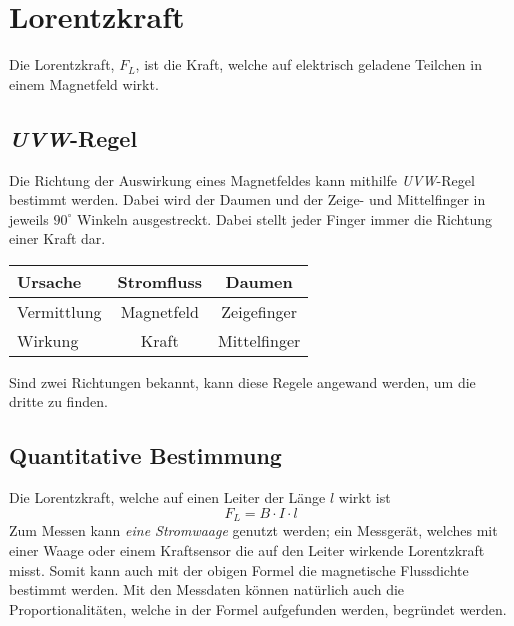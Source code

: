 \documentclass{article}
\begin{document}
 
\section{Lorentzkraft}
Die Lorentzkraft, $F_L$, ist die Kraft, welche auf elektrisch geladene Teilchen in einem Magnetfeld wirkt. 
\subsection{\emph{UVW}-Regel} 
Die Richtung der Auswirkung eines Magnetfeldes kann mithilfe \emph{UVW}-Regel bestimmt werden. Dabei wird der Daumen und der Zeige- und Mittelfinger in jeweils $90^\circ$ Winkeln ausgestreckt. Dabei stellt jeder Finger immer die Richtung einer Kraft dar.
\begin{center}
\begin{tabular}{ |l|c|c| }
\hline
 \colorbox{red!30}{U}rsache & Stromfluss & Daumen \\
\hline
 \colorbox{red!30}{V}ermittlung & Magnetfeld & Zeigefinger \\
\hline
 \colorbox{red!30}{W}irkung & Kraft & Mittelfinger \\
\hline
\end{tabular}
\end{center}
Sind zwei Richtungen bekannt, kann diese Regele angewand werden, um die dritte zu finden.
 
\subsection{Quantitative Bestimmung} 
\begin{minipage}{\dimexpr\linewidth-5cm} 
Die Lorentzkraft, welche auf einen Leiter der Länge $l$ wirkt ist
\[
 F_L = B \cdot I \cdot l
\]
Zum Messen kann \emph{eine Stromwaage} genutzt werden; ein Messgerät, welches mit einer Waage oder einem Kraftsensor die auf den Leiter wirkende Lorentzkraft misst. Somit kann auch mit der obigen Formel die magnetische Flussdichte bestimmt werden. \newline
Mit den Messdaten können natürlich auch die Proportionalitäten, welche in der Formel aufgefunden werden, begründet werden.
\end{minipage} 
\hfill
\begin{minipage}{5cm}
 \center
\end{minipage} 
\end{document}
